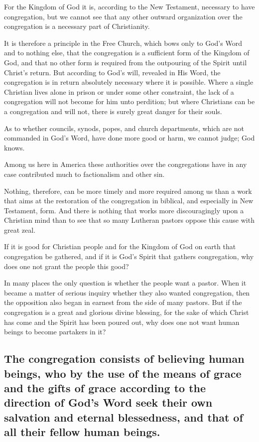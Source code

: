 For the Kingdom of God it is, according to the New Testament, necessary to have congregation, but we cannot see that any other outward organization over the congregation is a necessary part of Christianity.

It is therefore a principle in the Free Church, which bows only to God’s Word and to nothing else, that the congregation is a sufficient form of the Kingdom of God, and that no other form is required from the outpouring of the Spirit until Christ’s return. But according to God’s will, revealed in His Word, the congregation is in return absolutely necessary where it is possible. Where a single Christian lives alone in prison or under some other constraint, the lack of a congregation will not become for him unto perdition; but where Christians can be a congregation and will not, there is surely great danger for their souls.

As to whether councils, synods, popes, and church departments, which are not commanded in God’s Word, have done more good or harm, we cannot judge; God knows.

Among us here in America these authorities over the congregations have in any case contributed much to factionalism and other sin.

Nothing, therefore, can be more timely and more required among us than a work that aims at the restoration of the congregation in biblical, and especially in New Testament, form. And there is nothing that works more discouragingly upon a Christian mind than to see that so many Lutheran pastors oppose this cause with great zeal.

If it is good for Christian people and for the Kingdom of God on earth that congregation be gathered, and if it is God’s Spirit that gathers congregation, why does one not grant the people this good?

In many places the only question is whether the people want a pastor. When it became a matter of serious inquiry whether they also wanted congregation, then the opposition also began in earnest from the side of many pastors. But if the congregation is a great and glorious divine blessing, for the sake of which Christ has come and the Spirit has been poured out, why does one not want human beings to become partakers in it?





\subsection{The congregation consists of believing human beings, who by the use of the means of grace and the gifts of grace according to the direction of God’s Word seek their own salvation and eternal blessedness, and that of all their fellow human beings.}

